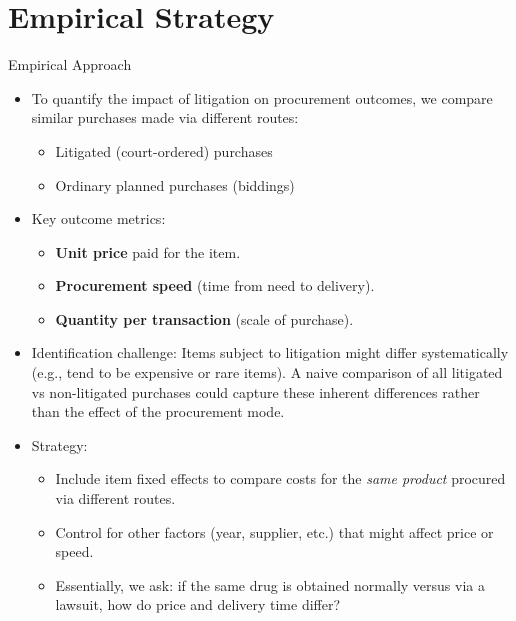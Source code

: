 \documentclass{beamer}
\begin{document}
\section{Empirical Strategy}

\begin{frame}{Empirical Approach}
\begin{itemize}
  \item To quantify the impact of litigation on procurement outcomes, we compare similar purchases made via different routes:
    \begin{itemize}
      \item Litigated (court-ordered) purchases 
      \item Ordinary planned purchases (biddings)
    \end{itemize}
  \item Key outcome metrics:
    \begin{itemize}
      \item \textbf{Unit price} paid for the item.
      \item \textbf{Procurement speed} (time from need to delivery).
      \item \textbf{Quantity per transaction} (scale of purchase).
    \end{itemize}
  \item Identification challenge: Items subject to litigation might differ systematically (e.g., tend to be expensive or rare items). A naive comparison of all litigated vs non-litigated purchases could capture these inherent differences rather than the effect of the procurement mode.
  \item Strategy:
    \begin{itemize}
      \item Include item fixed effects to compare costs for the \emph{same product} procured via different routes.
      \item Control for other factors (year, supplier, etc.) that might affect price or speed.
      \item Essentially, we ask: if the same drug is obtained normally versus via a lawsuit, how do price and delivery time differ?
    \end{itemize}
\end{itemize}
\end{frame}
\end{document}
